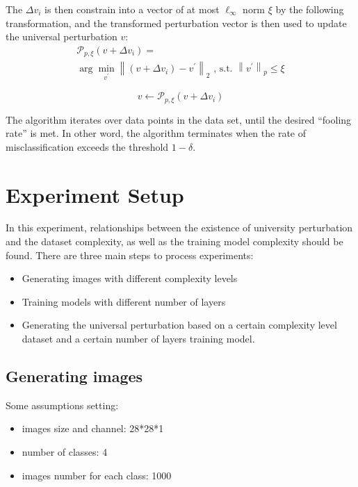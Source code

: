 \documentclass{article}
\begin{document}
\noindent The $\Delta v_{i}$ is then constrain into a vector of at most $\ell_{ \infty}$ norm $\xi$ by the following transformation, and the transformed perturbation vector is then used to update the universal perturbation $v$:
\begin{multline*}\label{eq11}
      \mathcal{P}_{p, \xi}\left(v+\Delta v_{i}\right)= \\
  \arg \min _{v^{\prime}}\left\|(v+\Delta v_{i})-v^{\prime}\right\|_{2} \mbox{ ,  s.t. $\left\|v^{\prime}\right\|_{p} \leq \xi$}
\end{multline*}

		\begin{equation*}
				v \leftarrow \mathcal{P}_{p, \xi}\left(v+\Delta v_{i}\right)
			\end{equation*}

\noindent The algorithm iterates over data points in the data set, until the desired “fooling rate” is met. In other word, the algorithm terminates when the rate of misclassification exceeds the threshold $1-\delta$.


\section{Experiment Setup}
In this experiment, relationships between the existence of university perturbation and the dataset complexity, as well as the training model complexity should be found. There are three main steps to process experiments:

\begin{itemize}
    \item Generating images with different complexity levels
    \item Training models with different number of layers
    \item Generating the universal perturbation based on a certain complexity level dataset and a certain number of layers training model. 
\end{itemize}

\subsection{Generating images}

Some assumptions setting: 
\begin{itemize}
    \item images size and channel: 28*28*1
    \item number of classes: 4
    \item images number for each class: 1000
\end{itemize}
\end{document}
